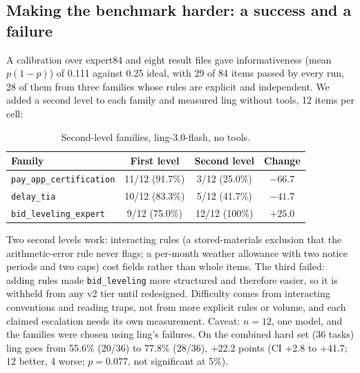 \documentclass[11pt]{article}
\begin{document}
\subsection{Making the benchmark harder: a success and a failure}
A calibration over expert84 and eight result files gave informativeness (mean $p(1-p)$) of 0.111 against 0.25 ideal, with 29 of 84 items passed by every run, 28 of them from three families whose rules are explicit and independent. We added a second level to each family and measured ling without tools, 12 items per cell:
\begin{table}[h]
\centering\small
\begin{tabular}{@{}lccc@{}}
\toprule
Family & First level & Second level & Change\\
\midrule
\texttt{pay\_app\_certification} & 11/12 (91.7\%) & 3/12 (25.0\%) & $-66.7$\\
\texttt{delay\_tia} & 10/12 (83.3\%) & 5/12 (41.7\%) & $-41.7$\\
\texttt{bid\_leveling\_expert} & 9/12 (75.0\%) & 12/12 (100\%) & $+25.0$\\
\bottomrule
\end{tabular}
\caption{Second-level families, ling-3.0-flash, no tools.}
\end{table}
Two second levels work: interacting rules (a stored-materials exclusion that the arithmetic-error rule never flags; a per-month weather allowance with two notice periods and two caps) cost fields rather than whole items. The third failed: adding rules made \texttt{bid\_leveling} more structured and therefore easier, so it is withheld from any v2 tier until redesigned. Difficulty comes from interacting conventions and reading traps, not from more explicit rules or volume, and each claimed escalation needs its own measurement. Caveat: $n=12$, one model, and the families were chosen using ling's failures. On the combined hard set (36 tasks) ling goes from 55.6\% (20/36) to 77.8\% (28/36), +22.2 points (CI +2.8 to +41.7; 12 better, 4 worse; $p=0.077$, not significant at 5\%).
\end{document}
